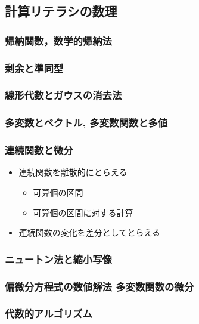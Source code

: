 \documentclass[dvipdfmx,11pat]{jarticle}
\begin{document}
\subsection{計算リテラシの数理}
\label{sec:orgc6072a6}
\subsubsection{帰納関数，数学的帰納法}
\label{sec:org05b81b6}
\subsubsection{剰余と準同型}
\label{sec:orgf4756d6}
\subsubsection{線形代数とガウスの消去法}
\label{sec:org13b1019}

\subsubsection{多変数とベクトル, 多変数関数と多値}
\label{sec:orgad383a9}
\subsubsection{連続関数と微分}
\label{sec:orge67c2ab}
\begin{itemize}
\item 連続関数を離散的にとらえる
\begin{itemize}
\item 可算個の区間
\item 可算個の区間に対する計算
\end{itemize}
\item 連続関数の変化を差分としてとらえる
\end{itemize}
\subsubsection{ニュートン法と縮小写像}
\label{sec:orgee235e5}

\subsubsection{偏微分方程式の数値解法 多変数関数の微分}
\label{sec:org8fbd61a}

\subsubsection{代数的アルゴリズム}
\label{sec:org1e6bc56}
\end{document}
